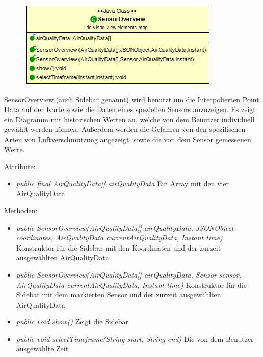 \begin{minipage}{0.4\textwidth}
    \begin{figure}[H]
        \includegraphics[scale = 0.5]{media/frontend/view/de.view.elements.map/SensorOverview_Class.png}
    \end{figure}
    \end{minipage} \hfill
    \begin{minipage}{0.4\textwidth}
SensorOverview (auch Sidebar genannt) wird benutzt um die Interpolierten Point Data auf der Karte sowie die Daten eines speziellen Sensors anzuzeigen. Es zeigt ein Diagramm mit historischen Werten an, welche von dem Benutzer individuell gewählt werden können. Außerdem werden die Gefahren von den spezifischen Arten von Luftverschmutzung angezeigt, sowie die von dem Sensor gemessenen Werte.
\end{minipage}

Attribute:
\begin{itemize}
    \item \emph{public final AirQualityData[] airQualityData} Ein Array mit den vier AirQualityData
\end{itemize}
Methoden:
\begin{itemize}
    \item \emph{public SensorOverview(AirQualityData[] airQualityData, JSONObject coordinates, AirQualityData currentAirQualityData, Instant time)} Konstruktor für die Sidebar mit den Koordinaten und der zurzeit ausgewählten AirQualityData
    \item \emph{public SensorOverview(AirQualityData[] airQualityData, Sensor sensor, AirQualityData currentAirQualityData, Instant time)} Konstruktor für die Sidebar mit dem markierten Sensor und der zurzeit ausgewählten AirQualityData
    \item \emph{public void show()} Zeigt die Sidebar
    \item \emph{public void selectTimeframe(String start, String end)} Die von dem Benutzer ausgewählte Zeit
\end{itemize}
